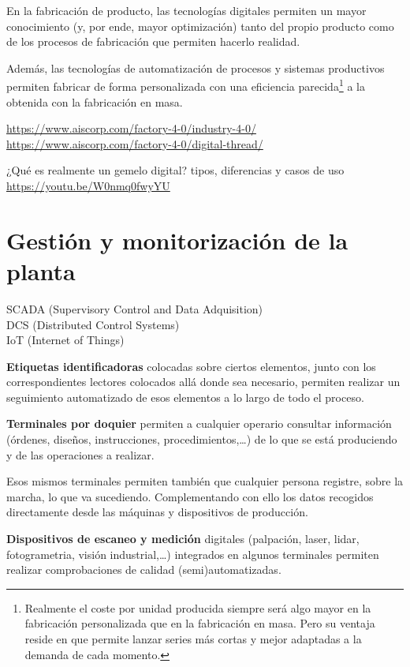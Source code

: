\documentclass[spanish,12pt,a4paper,final,oneside]{book}
\begin{document}
En la fabricación de producto, las tecnologías digitales permiten un mayor conocimiento (y, por ende, mayor optimización) tanto del propio producto como de los procesos de fabricación que permiten hacerlo realidad.

Además, las tecnologías de automatización de procesos y sistemas productivos permiten fabricar de forma personalizada con una eficiencia parecida\footnote{Realmente el coste por unidad producida siempre será algo mayor en la fabricación personalizada que en la fabricación en masa. Pero su ventaja reside en que permite lanzar series más cortas y mejor adaptadas a la demanda de cada momento.} a la obtenida con la fabricación en masa. 



\vspace{0.5cm}

\url{https://www.aiscorp.com/factory-4-0/industry-4-0/}
\\ \url{https://www.aiscorp.com/factory-4-0/digital-thread/}

¿Qué es realmente un gemelo digital? tipos, diferencias y casos de uso
\\ \url{https://youtu.be/W0nmq0fwyYU}



\section{Gestión y monitorización de la planta}
SCADA (Supervisory Control and Data Adquisition)
\\DCS (Distributed Control Systems)
\\IoT (Internet of Things)

\textbf{Etiquetas identificadoras} colocadas sobre ciertos elementos, junto con los correspondientes lectores colocados allá donde sea necesario, permiten realizar un seguimiento automatizado de esos elementos a lo largo de todo el proceso.

\textbf{Terminales por doquier} permiten a cualquier operario consultar información (órdenes, diseños, instrucciones, procedimientos,\ldots) de lo que se está produciendo y de las operaciones a realizar. 

Esos mismos terminales permiten también que cualquier persona registre, sobre la marcha, lo que va sucediendo. Complementando con ello los datos recogidos directamente desde las máquinas y dispositivos de producción.

\textbf{Dispositivos de escaneo y medición} digitales (palpación, laser, lidar, fotogrametria, visión industrial,\ldots) integrados en algunos terminales permiten realizar comprobaciones de calidad (semi)automatizadas. 
\end{document}
